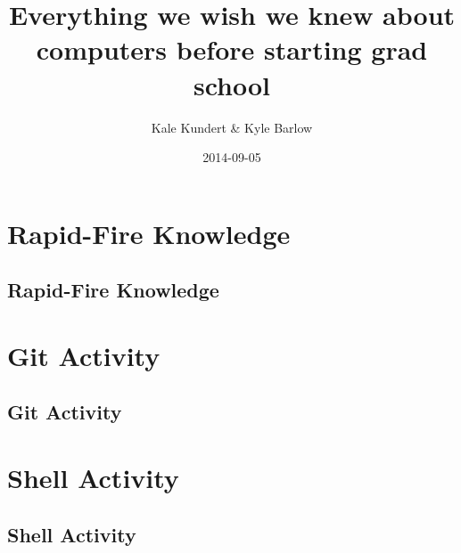 \documentclass[xcolor=x11names,compress,aspectratio=43]{beamer}
\title[Bootcamp Hacking] %
{Everything we wish we knew about computers before starting grad school}
\author[] %
{Kale Kundert \& Kyle Barlow}
\date[] %
{2014-09-05}
\renewcommand{\(}{\begin{columns}}
\renewcommand{\)}{\end{columns}}
\newcommand{\<}[1]{\begin{column}{#1}}
\renewcommand{\>}{\end{column}}
\begin{document}


\contourlength{2pt} %

\begin{frame}
 \titlepage
\end{frame}


\section{Rapid-Fire Knowledge}
\subsection{Rapid-Fire Knowledge}





\section{Git Activity}
\subsection{Git Activity}



\section{Shell Activity}
\subsection{Shell Activity}


\end{document}
